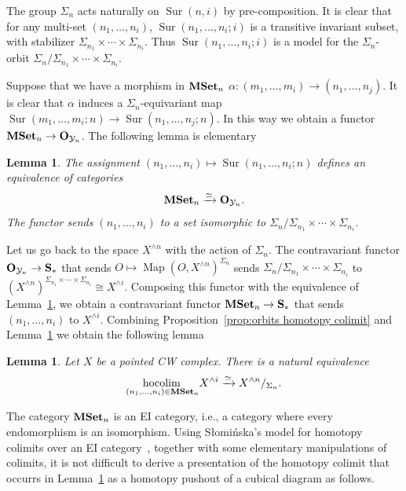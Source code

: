 \documentclass[psamsfonts]{amsart}
\theoremstyle{plain}
\newtheorem{lem}[thm]{Lemma}
\theoremstyle{definition}
\theoremstyle{remark}
\newcommand{\catname}[1]{{\normalfont\textbf{#1}}}
\newcommand{\mset}{\catname{MSet}}
\newcommand{\spaces}{\catname{S}_*}
\newcommand{\orbit}{\catname{O}}
\DeclareMathOperator{\map}{Map}
\DeclareMathOperator{\sur}{Sur}
\DeclareMathOperator{\hocolim}{hocolim \,}
\begin{document}
The group $\Sigma_n$ acts naturally on $\sur(n, i)$ by pre-composition. It is clear that for any multi-set $(n_1, \ldots, n_i)$, $\sur(n_1, \ldots, n_i; i)$ is a transitive invariant subset, with stabilizer $\Sigma_{n_1}\times \cdots \times \Sigma_{n_i}$. Thus $\sur(n_1, \ldots, n_i; i)$ is a model for the $\Sigma_n$-orbit $\Sigma_n/\Sigma_{n_1}\times \cdots\times \Sigma_{n_i}$. 

Suppose that we have a morphism in $\mset_n$ $\alpha\colon (m_1, \ldots, m_i)\to (n_1, \ldots, n_j)$. It is clear that $\alpha$ induces a $\Sigma_n$-equivariant map $\sur(m_1, \ldots, m_i; n)\to \sur(n_1, \ldots, n_j; n)$. In this way we obtain a functor $\mset_n\to \orbit_{{\mathcal Y}_n}$. The following lemma is elementary
\begin{lem}\label{lem:multiset}
The assignment $(n_1, \ldots, n_i)\mapsto \sur(n_1, \ldots, n_i; n)$ defines an equivalence of categories
\[
\mset_n\xrightarrow{\simeq} \orbit_{{\mathcal Y}_n}.
\]
The functor sends $(n_1, \ldots, n_i)$ to a set isomorphic to $\Sigma_{n}/\Sigma_{n_1}\times\cdots\times\Sigma_{n_i}$.
\end{lem}
Let us go back to the space $X^{\wedge n}$ with the action of $\Sigma_n$. The contravariant functor $\orbit_{{\mathcal Y}_n}\to \spaces$ that sends $O \mapsto \map(O, X^{\wedge n})^{\Sigma_n}$ sends $\Sigma_n/\Sigma_{n_1}\times\cdots\times \Sigma_{n_i}$ to $(X^{\wedge n})^{\Sigma_{n_1}\times\cdots\times \Sigma_{n_i}}\cong X^{\wedge i}$. Composing this functor with the equivalence of Lemma~\ref{lem:multiset}, we obtain a contravariant functor $\mset_n\to \spaces$ that sends $(n_1, \ldots, n_i)$ to $X^{\wedge i}$. 
Combining Proposition~\ref{prop:orbits homotopy colimit} and Lemma~\ref{lem:multiset} we obtain the following lemma
\begin{lem}\label{lem:hocolim to orbit}
Let $X$ be a pointed CW complex. There is a natural equivalence
\[
\underset{(n_1, \ldots, n_i)\in \mset_n}{\hocolim}X^{\wedge i}\xrightarrow{\simeq} X^{\wedge n}/_{\Sigma_n}.
\]
\end{lem}
The category $\mset_n$ is an EI category, i.e., a category where every endomorphism is an isomorphism. Using S{\l}omi\'nska's model for homotopy colimits over an EI category~\cite{Slominska}, together with some elementary manipulations of colimits, it is not difficult to derive a presentation of the homotopy colimit that occurrs in Lemma~\ref{lem:hocolim to orbit} as a homotopy pushout of a cubical diagram as follows. 
\end{document}
